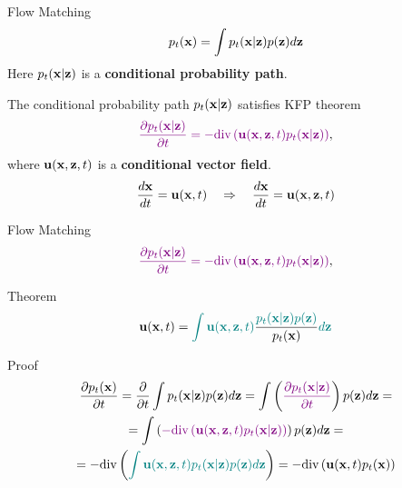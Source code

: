 \begin{frame}{Flow Matching}
	\[
		p_t(\mathbf{x}) = \int p_t(\mathbf{x} | \mathbf{z}) p(\mathbf{z}) d \mathbf{z} 
	\]
	Here $p_t(\mathbf{x} | \mathbf{z})$ is a \textbf{conditional probability path}.
	
	The conditional probability path $p_t(\mathbf{x} | \mathbf{z})$ satisfies KFP theorem
	\[
		{\color{violet}\frac{\partial p_t(\mathbf{x} | \mathbf{z})}{\partial t} = - \text{div}\left(\mathbf{u}(\mathbf{x}, \mathbf{z}, t) p_t(\mathbf{x} | \mathbf{z})\right)},
	\]
	where $\mathbf{u}(\mathbf{x}, \mathbf{z}, t)$ is a \textbf{conditional vector field}.
	\[
		\frac{d\mathbf{x}}{dt} = \mathbf{u}(\mathbf{x}, t) \quad \Rightarrow \quad \frac{d\mathbf{x}}{dt} = \mathbf{u}(\mathbf{x}, \mathbf{z}, t)
	\]
\end{frame}
\begin{frame}{Flow Matching}
	\[
		{\color{violet}\frac{\partial p_t(\mathbf{x} | \mathbf{z})}{\partial t} = - \text{div}\left(\mathbf{u}(\mathbf{x}, \mathbf{z}, t) p_t(\mathbf{x} | \mathbf{z})\right)},
	\]
	\begin{block}{Theorem}
		\vspace{-0.3cm}
		\[
			\mathbf{u}(\mathbf{x}, t) = {\color{teal}\int \mathbf{u}(\mathbf{x}, \mathbf{z}, t)} \frac{\color{teal}p_t(\mathbf{x} | \mathbf{z}) p(\mathbf{z})}{p_t(\mathbf{x})} {\color{teal}d \mathbf{z}}
		\]
		\vspace{-0.4cm}
	\end{block}
	\begin{block}{Proof}
		\vspace{-0.5cm}
		\begin{multline*}
			\frac{\partial p_t(\mathbf{x})}{\partial t} = \frac{\partial}{\partial t} \int p_t(\mathbf{x} | \mathbf{z}) p(\mathbf{z}) d \mathbf{z} =  \int \left( {\color{violet} \frac{\partial p_t(\mathbf{x} | \mathbf{z})}{\partial t} } \right) p(\mathbf{z}) d \mathbf{z} = \\
			= \int \left( {\color{violet} - \text{div}\left(\mathbf{u}(\mathbf{x}, \mathbf{z}, t) p_t(\mathbf{x} | \mathbf{z})\right) } \right) p(\mathbf{z}) d \mathbf{z} = \\
			= - \text{div} \left({\color{teal}\int \mathbf{u}(\mathbf{x}, \mathbf{z}, t) p_t(\mathbf{x} | \mathbf{z}) p(\mathbf{z}) d \mathbf{z} }\right) = - \text{div}  \left(\mathbf{u}(\mathbf{x}, t) p_t(\mathbf{x})\right)
		\end{multline*}
	\end{block}
\end{frame}
